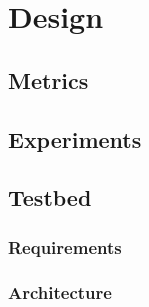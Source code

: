 \chapter{Design} %
\label{chap:Design}

\section{Metrics} %
\label{sec:Metrics}



\section{Experiments} %
\label{sec:Experiments}



\section{Testbed} %
\label{sec:Testbed_Design}

\subsection{Requirements} %
\label{sub:Requirements}


\subsection{Architecture} %
\label{sub:Architecture}



